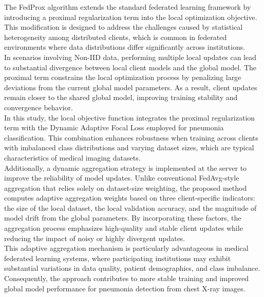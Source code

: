 \documentclass[12pt]{book}
\begin{document}
The FedProx algorithm extends the standard federated learning framework by introducing a proximal regularization term into the local optimization objective. This modification is designed to address the challenges caused by statistical heterogeneity among distributed clients, which is common in federated environments where data distributions differ significantly across institutions.\\
In scenarios involving Non-IID data, performing multiple local updates can lead to substantial divergence between local client models and the global model. The proximal term constrains the local optimization process by penalizing large deviations from the current global model parameters. As a result, client updates remain closer to the shared global model, improving training stability and convergence behavior.\\
In this study, the local objective function integrates the proximal regularization term with the Dynamic Adaptive Focal Loss employed for pneumonia classification. This combination enhances robustness when training across clients with imbalanced class distributions and varying dataset sizes, which are typical characteristics of medical imaging datasets.\\
Additionally, a dynamic aggregation strategy is implemented at the server to improve the reliability of model updates. Unlike conventional FedAvg-style aggregation that relies solely on dataset-size weighting, the proposed method computes adaptive aggregation weights based on three client-specific indicators: the size of the local dataset, the local validation accuracy, and the magnitude of model drift from the global parameters. By incorporating these factors, the aggregation process emphasizes high-quality and stable client updates while reducing the impact of noisy or highly divergent updates.\\
This adaptive aggregation mechanism is particularly advantageous in medical federated learning systems, where participating institutions may exhibit substantial variations in data quality, patient demographics, and class imbalance. Consequently, the approach contributes to more stable training and improved global model performance for pneumonia detection from chest X-ray images.
\end{document}
